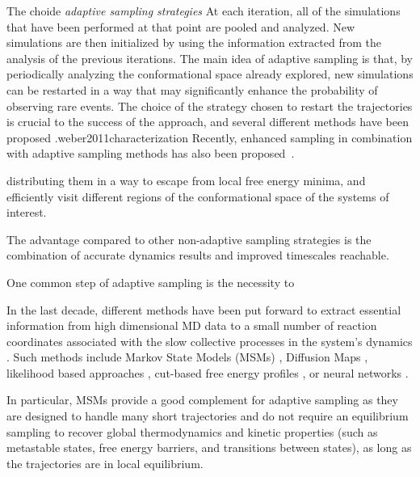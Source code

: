 The choide \emph{adaptive sampling strategies}
At each iteration, all of the simulations that have been performed at that
point are pooled and analyzed. New simulations are then initialized by
using the information extracted from the analysis of the previous iterations.
The main idea of adaptive sampling is that, by periodically analyzing the
conformational space already explored, new simulations can be restarted 
in a way that may significantly enhance the probability of observing rare
events. The choice of the strategy chosen to restart the trajectories is crucial
to the success of the approach, and several different methods have been
proposed \cite{weber2011characterization, Fabritiis-2014,
AdaptivePELE-Lecina2017,preto2014fast, doerr2016htmd,roblitz2013fuzzy,
weexplore, WESTPA-Zwier2015}.weber2011characterization
Recently, enhanced sampling in combination with adaptive sampling methods has
also been proposed~\cite{pathreweight5}.




 distributing them in a way to 
escape from local free energy minima, and efficiently visit different regions of
the conformational space of the systems of interest.

The advantage compared to other non-adaptive sampling strategies is the combination of accurate dynamics results and improved timescales reachable.

One common step of adaptive sampling is the necessity to 

 In the last decade, different methods have been
put forward to extract essential information from high dimensional MD data to a
small number of reaction coordinates associated with the slow
collective processes in the system's dynamics \cite{rohrdanz2013discovering,
noe2017collective}. Such methods include Markov State Models (MSMs) \cite{prinz2011markov,
MSM-Pande-2018,bookmsm,masterequationsMSM,SCHUTTE1999146}, Diffusion Maps
\cite{Coifman7426, rohrdanz2011determination,Zheng2011, Boninsegna2015}, likelihood based approaches
\cite{peters2006obtaining}, cut-based free energy profiles
\cite{krivov2008diffusive}, or neural networks \cite{Mardt2018,wehmeyer2018time,
ribeiro2018reweighted}.  

In particular, MSMs provide a good complement for
adaptive sampling as they are designed to handle many short trajectories and
do not require an equilibrium sampling to recover global thermodynamics and
kinetic properties (such as metastable states, free energy barriers, and
transitions between states), as long as the trajectories are in local
equilibrium.  

